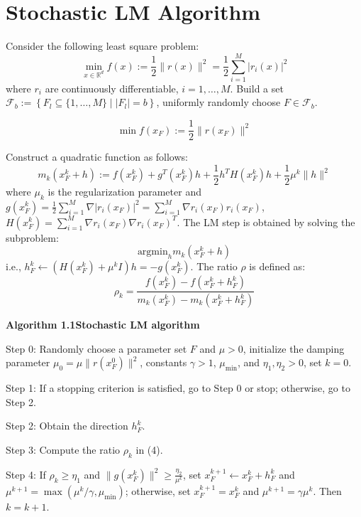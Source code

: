 \documentclass{article}
\newcommand{\tmstrong}[1]{\textbf{#1}}
\newenvironment{tmindent}{\begin{tmparmod}{1.5em}{0pt}{0pt}}{\end{tmparmod}}
\newenvironment{tmparmod}[3]{\begin{list}{}{\setlength{\topsep}{0pt}\setlength{\leftmargin}{#1}\setlength{\rightmargin}{#2}\setlength{\parindent}{#3}\setlength{\listparindent}{\parindent}\setlength{\itemindent}{\parindent}\setlength{\parsep}{\parskip}} \item[]}{\end{list}}
\begin{document}
	
	\section{Stochastic LM Algorithm}
	
	Consider the following least square problem:
	\begin{equation}
		\min_{x \in \mathbb{R}^d} f (x) := \frac{1}{2} \| r (x) \|^2 = \frac{1}{2}
		\sum_{i = 1}^M | r_i (x) |^2
	\end{equation}
	where $r_i$ are continuously differentiable, $i = 1, \dots, M$. Build a set
	$\mathcal{F}_b := \left\{ F_l \subseteq \{1, \dots, M\} \mid |F_l| = b \right\}$, uniformly
	randomly choose $F \in \mathcal{F}_b$.
	
	\begin{equation}
		\min f (x_{F}) := \frac{1}{2} \| r (x_F) \|^2
	\end{equation}
	
	Construct a quadratic function as follows:
	\begin{equation}
		m_k (x_F^k + h) := f (x^k_F) + g^T (x_F^k) h + \frac{1}{2} h^T H
		(x_F^k) h + \frac{1}{2} \mu^k \| h \|^2
	\end{equation}
	where $\mu_k$ is the regularization parameter and $g (x_F^k) = \frac{1}{2}
	\sum_{i = 1}^M \nabla | r_i (x_F) |^2 = \sum_{i = 1}^M \nabla r_i (x_F) r_i
	(x_F)$, $H (x_F^k) = \sum_{i = 1}^M \nabla r_i (x_F) \nabla r_i
	(x_F)^T$. The LM step is obtained by solving the subproblem:
	\[
	\text{argmin}_h m_k (x_F^k + h)
	\]
	i.e., $h_F^k \leftarrow (H (x_F^k) + \mu^k I) h = - g (x_F^k)$. The ratio $\rho$
	is defined as:
	\begin{equation}
		\rho_k = \frac{f (x^k_F) - f (x^k_F + h_F^k)}{m_k (x^k_F) - m_k (x^k_F +
			h_F^k)}
	\end{equation}
	
	\begin{flushleft}
		\tmstrong{Algorithm 1.1\quad Stochastic LM algorithm}\smallskip
		
		\begin{tmindent}
			Step 0: Randomly choose a parameter set $F$ and $\mu > 0$, initialize the
			damping parameter $\mu_0 = \mu \| r (x_F^0) \|^2$, constants
			$\gamma > 1$, $\mu_{\min}$, and $\eta_1, \eta_2 > 0$, set $k = 0$.
			
			\medskip
			
			Step 1: If a stopping criterion is satisfied, go to Step 0 or stop;
			otherwise, go to Step 2.
			
			\medskip
			
			Step 2: Obtain the direction $h_F^k$.
			
			\medskip
			
			Step 3: Compute the ratio $\rho_k$ in (4).
			
			\medskip
			
			Step 4: If $\rho_k \geq \eta_1$ and $\| g (x_F^k) \|^2 \geq \frac{\eta_2}{\mu^k}$,
			set $x^{k + 1}_F \leftarrow x^k_F + h_F^k$ and $\mu^{k + 1} = \max (\mu^k / \gamma, \mu_{\min})$;
			otherwise, set $x_F^{k + 1} = x_F^k$ and $\mu^{k + 1} = \gamma \mu^k$. Then $k = k + 1$.
		\end{tmindent}
	\end{flushleft}
	
\end{document}

